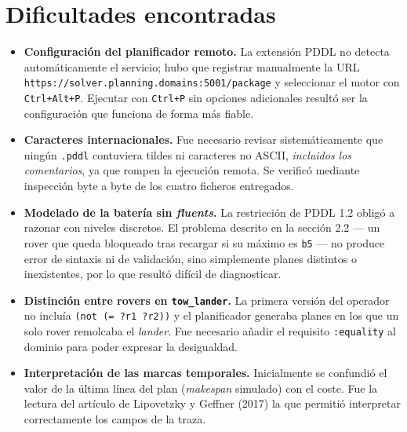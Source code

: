 \documentclass[12pt,a4paper]{article}
\begin{document}
\section{Dificultades encontradas}

\begin{itemize}[leftmargin=*]
\item \textbf{Configuraci\'on del planificador remoto.} La extensi\'on PDDL no
detecta autom\'aticamente el servicio; hubo que registrar manualmente la URL
\texttt{https://solver.planning.domains:5001/package} y seleccionar el motor
con \texttt{Ctrl+Alt+P}. Ejecutar con \texttt{Ctrl+P} sin opciones adicionales
result\'o ser la configuraci\'on que funciona de forma m\'as fiable.

\item \textbf{Caracteres internacionales.} Fue necesario revisar
sistem\'aticamente que ning\'un \texttt{.pddl} contuviera tildes ni
caracteres no ASCII, \emph{incluidos los comentarios}, ya que rompen la
ejecuci\'on remota. Se verific\'o mediante inspecci\'on byte a byte de los
cuatro ficheros entregados.

\item \textbf{Modelado de la bater\'ia sin \emph{fluents}.} La restricci\'on
de PDDL 1.2 oblig\'o a razonar con niveles discretos. El problema descrito en
la secci\'on 2.2 --- un rover que queda bloqueado tras recargar si su m\'aximo
es \texttt{b5} --- no produce error de sintaxis ni de validaci\'on, sino
simplemente planes distintos o inexistentes, por lo que result\'o dif\'icil de
diagnosticar.

\item \textbf{Distinci\'on entre rovers en \texttt{tow\_lander}.} La primera
versi\'on del operador no inclu\'ia \texttt{(not (= ?r1 ?r2))} y el
planificador generaba planes en los que un solo rover remolcaba el
\emph{lander}. Fue necesario a\~nadir el requisito \texttt{:equality} al
dominio para poder expresar la desigualdad.

\item \textbf{Interpretaci\'on de las marcas temporales.} Inicialmente se
confundi\'o el valor de la \'ultima l\'inea del plan (\emph{makespan}
simulado) con el coste. Fue la lectura del art\'iculo de Lipovetzky y Geffner
(2017) la que permiti\'o interpretar correctamente los campos de la traza.
\end{itemize}
\end{document}
